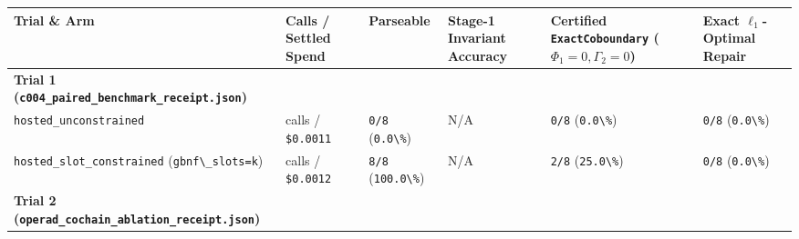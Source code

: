 \documentclass[
  11pt,
]{article}
\newcommand{\passthrough}[1]{#1}
\begin{document}
\begingroup\begin{landscape}\small
\begin{longtable}[]{@{}
  >{\raggedright\arraybackslash}p{}
  >{\raggedright\arraybackslash}p{}
  >{\raggedright\arraybackslash}p{}
  >{\raggedright\arraybackslash}p{}
  >{\raggedright\arraybackslash}p{}
  >{\raggedright\arraybackslash}p{}@{}}
\toprule\noalign{}
\begin{minipage}[b]{\linewidth}\raggedright
Trial \& Arm
\end{minipage} & \begin{minipage}[b]{\linewidth}\raggedright
Calls / Settled Spend
\end{minipage} & \begin{minipage}[b]{\linewidth}\raggedright
Parseable
\end{minipage} & \begin{minipage}[b]{\linewidth}\raggedright
Stage-1 Invariant Accuracy
\end{minipage} & \begin{minipage}[b]{\linewidth}\raggedright
Certified \nolinkurl{ExactCoboundary}
(\(\Phi_1 = 0,\allowbreak  \Gamma_2 = 0\))
\end{minipage} & \begin{minipage}[b]{\linewidth}\raggedright
Exact \(\ell_1\)-Optimal Repair
\end{minipage} \\
\midrule\noalign{}
\endhead
\bottomrule\noalign{}
\endlastfoot
\textbf{Trial 1 (\nolinkurl{c004_paired_benchmark_receipt.json})} & & &
& & \\
\nolinkurl{hosted_unconstrained} & 8 calls /
\passthrough{\lstinline!$0.0011!} & \passthrough{\lstinline!0/8!}
(\passthrough{\lstinline!0.0\%!}) & N/A & \passthrough{\lstinline!0/8!}
(\passthrough{\lstinline!0.0\%!}) & \passthrough{\lstinline!0/8!}
(\passthrough{\lstinline!0.0\%!}) \\
\nolinkurl{hosted_slot_constrained}
(\passthrough{\lstinline!gbnf\_slots=k!}) & 8 calls /
\passthrough{\lstinline!$0.0012!} & \passthrough{\lstinline!8/8!}
(\passthrough{\lstinline!100.0\%!}) & N/A &
\passthrough{\lstinline!2/8!} (\passthrough{\lstinline!25.0\%!}) &
\passthrough{\lstinline!0/8!} (\passthrough{\lstinline!0.0\%!}) \\
\textbf{Trial 2 (\nolinkurl{operad_cochain_ablation_receipt.json})} & &

\end{longtable}
\end{landscape}
\end{document}
